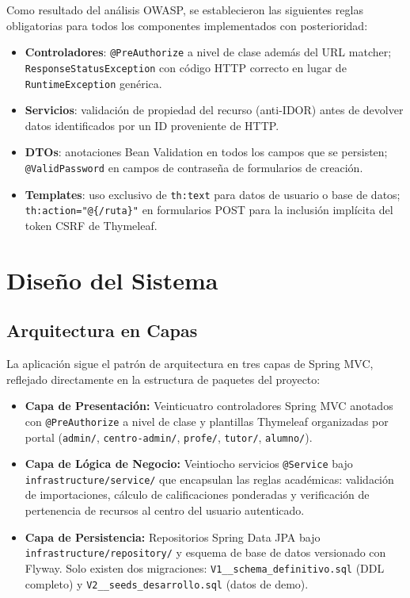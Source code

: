 \documentclass[12pt, a4paper]{report}
\begin{document}
Como resultado del análisis OWASP, se establecieron las siguientes reglas obligatorias para todos los componentes implementados con posterioridad:

\begin{itemize}
  \item \textbf{Controladores}: \texttt{@PreAuthorize} a nivel de clase además del URL matcher; \texttt{ResponseStatusException} con código HTTP correcto en lugar de \texttt{RuntimeException} genérica.
  \item \textbf{Servicios}: validación de propiedad del recurso (anti-IDOR) antes de devolver datos identificados por un ID proveniente de HTTP.
  \item \textbf{DTOs}: anotaciones Bean Validation en todos los campos que se persisten; \texttt{@ValidPassword} en campos de contraseña de formularios de creación.
  \item \textbf{Templates}: uso exclusivo de \texttt{th:text} para datos de usuario o base de datos; \texttt{th:action="@\{/ruta\}"} en formularios POST para la inclusión implícita del token CSRF de Thymeleaf.
\end{itemize}

\chapter{Diseño del Sistema}

\section{Arquitectura en Capas}

La aplicación sigue el patrón de arquitectura en tres capas de Spring MVC,
reflejado directamente en la estructura de paquetes del proyecto:

\begin{itemize}
  \item \textbf{Capa de Presentación:} Veinticuatro controladores Spring MVC anotados
        con \texttt{@PreAuthorize} a nivel de clase y plantillas Thymeleaf
        organizadas por portal (\texttt{admin/}, \texttt{centro-admin/},
        \texttt{profe/}, \texttt{tutor/}, \texttt{alumno/}).
  \item \textbf{Capa de Lógica de Negocio:} Veintiocho servicios
        \texttt{@Service} bajo \texttt{infrastructure/service/} que encapsulan
        las reglas académicas: validación de importaciones, cálculo de
        calificaciones ponderadas y verificación de pertenencia de recursos al
        centro del usuario autenticado.
  \item \textbf{Capa de Persistencia:} Repositorios Spring Data JPA bajo
        \texttt{infrastructure/repository/} y esquema de base de datos versionado
        con Flyway. Solo existen dos migraciones:
        \texttt{V1\_\_schema\_definitivo.sql} (DDL completo) y
        \texttt{V2\_\_seeds\_desarrollo.sql} (datos de demo).
\end{itemize}
\end{document}
